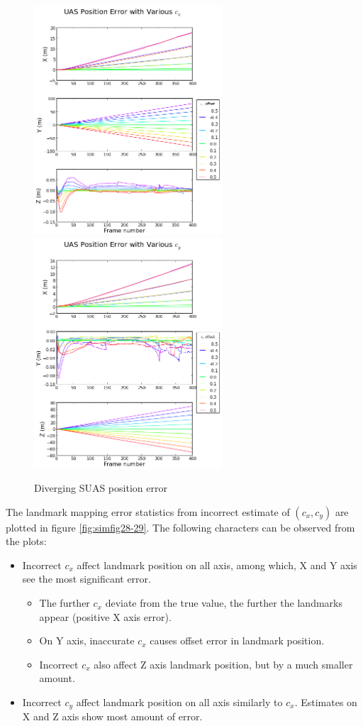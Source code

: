 \begin{figure}[h]
  \centering
  \includegraphics[width=7cm,keepaspectratio=true]{./Figures/SimulationFigures/Figure36.png}
  \includegraphics[width=7cm,keepaspectratio=true]{./Figures/SimulationFigures/Figure37.png}
  \caption{Diverging SUAS position error}
  \label{fig:simfig36-37}
\end{figure}
\FloatBarrier

The landmark mapping error statistics from incorrect estimate of $ (c_{x}, c_{y})$ are plotted in figure \ref{fig:simfig28-29}. The following characters can be observed from the plots:

\begin{itemize}
  \item Incorrect $c_{x}$ affect landmark position on all axis, among which, X and Y axis see the most significant error.
  \begin{itemize}
    \item The further $c_{x}$ deviate from the true value, the further the landmarks appear (positive X axis error).
    \item On Y axis, inaccurate $c_x$ causes offset error in landmark position. 
    \item Incorrect $c_{x}$ also affect Z axis landmark position, but by a much smaller amount.
  \end{itemize}
  \item Incorrect $c_{y}$ affect landmark position on all axis similarly to $c_{x}$. Estimates on X and Z axis show most amount of error.
\end{itemize}


